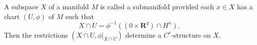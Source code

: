 A subspace $X$ of a manifold $M$ is called a submanifold provided each $x \in X$ has a chart $(U, \phi)$ of $M$ such that
$$X \cap U = \phi^{-1}((0 \times \mathbf{R}^q) \cap H^n).$$
Then the restrictions $(X \cap U, \phi|_{X \cap U})$ determine a $C^r$-structure on $X$.
